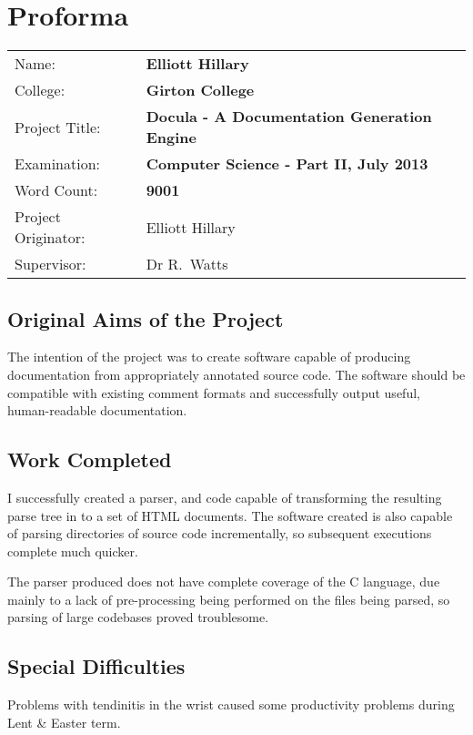 \chapter*{Proforma}

{\large
  \begin{tabular}{l l}
    Name:               & \bf Elliott Hillary                            \\
    College:            & \bf Girton College                             \\
    Project Title:      & \bf Docula - A Documentation Generation Engine \\
    Examination:        & \bf Computer Science - Part II, July 2013      \\
    Word Count:         & \bf 9001                                       \\
    Project Originator: & Elliott Hillary                                \\
    Supervisor:         & Dr R.~Watts                                    \\
  \end{tabular}
}

\section*{Original Aims of the Project}
The intention of the project was to create software capable of producing
documentation from appropriately annotated source code. The software should be
compatible with existing comment formats and successfully output useful,
human-readable documentation.


\section*{Work Completed}
I successfully created a parser, and code capable of transforming the
resulting parse tree in to a set of HTML documents. The software created is also
capable of parsing directories of source code incrementally, so subsequent
executions complete much quicker.

The parser produced does not have complete coverage of the C language, due
mainly to a lack of pre-processing being performed on the files being parsed, so
parsing of large codebases proved troublesome.


\section*{Special Difficulties}
Problems with tendinitis in the wrist caused some productivity problems
during Lent \& Easter term.
